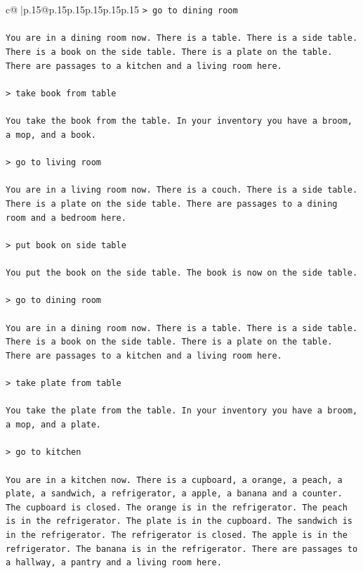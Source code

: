 \documentclass{article}
\begin{document}
{\begin{supertabular}{c@{$\;$}|p{.15\linewidth}@{}p{.15\linewidth}p{.15\linewidth}p{.15\linewidth}p{.15\linewidth}p{.15\linewidth}}
{{{\texttt{> go to dining room} \\
\\ 
\texttt{You are in a dining room now. There is a table. There is a side table. There is a book on the side table. There is a plate on the table. There are passages to a kitchen and a living room here.} \\
\\ 
\texttt{> take book from table} \\
\\ 
\texttt{You take the book from the table. In your inventory you have a broom, a mop, and a book.} \\
\\ 
\texttt{> go to living room} \\
\\ 
\texttt{You are in a living room now. There is a couch. There is a side table. There is a plate on the side table. There are passages to a dining room and a bedroom here.} \\
\\ 
\texttt{> put book on side table} \\
\\ 
\texttt{You put the book on the side table. The book is now on the side table.} \\
\\ 
\texttt{> go to dining room} \\
\\ 
\texttt{You are in a dining room now. There is a table. There is a side table. There is a book on the side table. There is a plate on the table. There are passages to a kitchen and a living room here.} \\
\\ 
\texttt{> take plate from table} \\
\\ 
\texttt{You take the plate from the table. In your inventory you have a broom, a mop, and a plate.} \\
\\ 
\texttt{> go to kitchen} \\
\\ 
\texttt{You are in a kitchen now. There is a cupboard, a orange, a peach, a plate, a sandwich, a refrigerator, a apple, a banana and a counter. The cupboard is closed. The orange is in the refrigerator. The peach is in the refrigerator. The plate is in the cupboard. The sandwich is in the refrigerator. The refrigerator is closed. The apple is in the refrigerator. The banana is in the refrigerator. There are passages to a hallway, a pantry and a living room here.} \\
}}}
\end{supertabular}}
\end{document}
